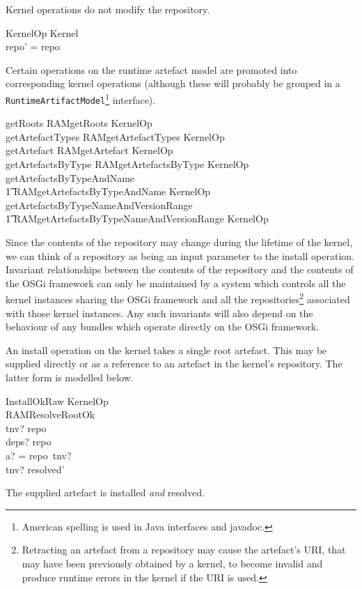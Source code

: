 \documentclass[a4paper,12pt]{article}
\begin{document}
Kernel operations do not modify the repository.
\begin{schema}{KernelOp}
\Delta Kernel \\
\where
repo' = repo \\
\end{schema}

Certain operations on the runtime artefact model are promoted into corresponding kernel operations
(although these will probably be grouped in a \texttt{RuntimeArtifactModel}\footnote{American spelling is used in Java interfaces and javadoc.} interface).
\begin{zed}
getRoots  RAMgetRoots \land KernelOp \\
\also
getArtefactTypes  RAMgetArtefactTypes \land KernelOp \\
\also
getArtefact  RAMgetArtefact \land KernelOp \\
\also
getArtefactsByType  RAMgetArtefactsByType \land KernelOp \\
\also
getArtefactsByTypeAndName  \\
\t1 RAMgetArtefactsByTypeAndName \land KernelOp \\
\also
getArtefactsByTypeNameAndVersionRange  \\
\t1 RAMgetArtefactsByTypeNameAndVersionRange \land KernelOp \\
\end{zed}

Since the contents of the repository may change during the lifetime of the kernel, we can think of a
repository as being an input parameter to the install operation.
Invariant relationships between the contents of the repository and the contents of the
OSGi framework can only be maintained by a system which controls all the kernel instances
sharing the OSGi framework and all the repositories\footnote{Retracting an artefact from a repository
may cause the artefact's URI, that may have been previously obtained by a kernel, to become invalid and produce runtime errors in the kernel if the URI is used.}
associated with those kernel instances.
Any such invariants will also depend on the behaviour of any bundles which operate
directly on the OSGi framework.

An install operation on the kernel takes a single root artefact.
This may be supplied directly or as a reference to an artefact in the kernel's repository.
The latter form is modelled below.
\begin{schema}{InstallOkRaw}
KernelOp \\
RAMResolveRootOk \\
\where
tnv? \in \dom repo \\
deps? \subseteq repo \\
a? = repo~tnv? \\
tnv? \in resolved' \\
\end{schema}
The supplied artefact is installed \textit{and} resolved.
\end{document}
